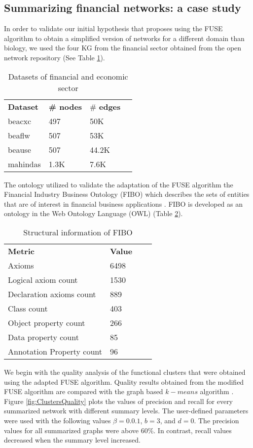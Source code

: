 \documentclass{ieeeaccess}
\begin{document}
\subsection{Summarizing financial networks: a case study}
In order to validate our initial hypothesis that proposes using the FUSE algorithm to obtain a simplified
version of networks for a different domain than biology, we used the four KG from the financial sector
obtained from the open network repository \cite{nr} (See Table \ref{tab:networks}).

\begin{table}[!ht]
\caption{Datasets of financial and economic sector}
\label{tab:networks}
\centering
\begin{tabular}{|l|l|l|l}
\hline
\bfseries Dataset & \bfseries \# nodes & \# \bfseries edges \\
beacxc & 497 & 50K \\ 
beaflw & 507 & 53K \\
beause & 507 & 44.2K \\
mahindas & 1.3K & 7.6K \\
\hline
\end{tabular}
\end{table}

The ontology utilized to validate the adaptation of the FUSE algorithm 
the Financial Industry Business Ontology  (FIBO) which describes the
sets of entities that are of interest in  financial business applications
\cite{FIBO}. FIBO is developed as an ontology in  the Web Ontology 
Language (OWL) (Table \ref{tab:fibo}).

\begin{table}[!ht]
\caption{Structural information of FIBO}
\label{tab:fibo}
\centering
\begin{tabular}{|l|l|l|l}
\hline
\bfseries Metric & \bfseries Value \\
Axioms & 6498 \\
Logical axiom count & 1530 \\
Declaration axioms count & 889 \\
Class count & 403 \\
Object property count & 266 \\
Data property count & 85 \\
Annotation Property count & 96 \\
\hline
\end{tabular}
\end{table}



We begin with the quality analysis of the functional clusters that were obtained
using the adapted FUSE algorithm. Quality results obtained from the modified FUSE algorithm
are compared with the graph based $k-means$ algorithm \cite{GraphMinning:2013}. Figure 
\ref{fig:ClustersQuality} plots the values of precision and recall for every summarized network with
different summary levels. The user-defined parameters were used with the following
values $\beta = 0.0.1$, $b = 3$, and $d = 0$. The precision values
for all summarized graphs were above 60\%. In contrast, recall values
decreased when the summary level increased.
\end{document}

